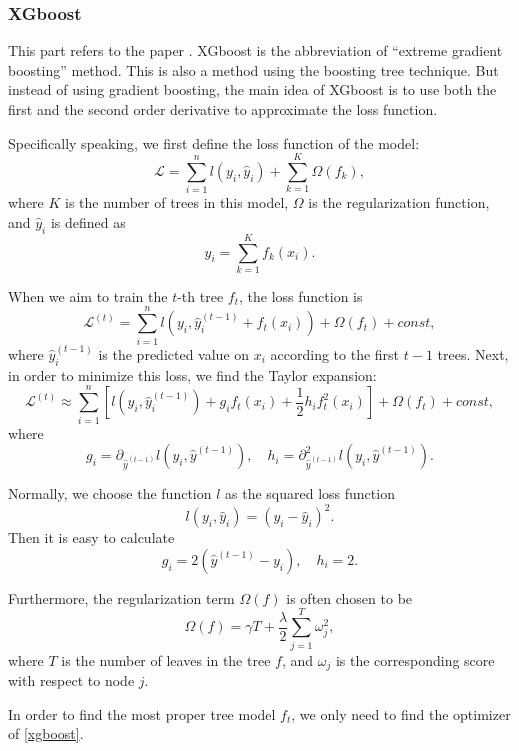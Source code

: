 \documentclass[english]{article}
\begin{document}
\subsubsection{XGboost}
\par This part refers to the paper \cite{chen1603xgboost}. XGboost is the abbreviation of ``extreme gradient boosting'' method. This is also a method using the boosting tree technique. But instead of using gradient boosting, the main idea of XGboost is to use both the first and the second order derivative to approximate the loss function.
\par Specifically speaking, we first define the loss function of the model:
\begin{equation}
	\mathcal{L} = \sum_{i=1}^{n}l(y_{i}, \hat{y}_{i}) + \sum_{k=1}^{K}\Omega(f_{k}),
\end{equation}
where $K$ is the number of trees in this model, $\Omega$ is the regularization function, and $\hat{y}_{i}$ is defined as
\begin{equation}
	\hat{y}_{i} = \sum_{k=1}^{K}f_{k}(x_{i}).
\end{equation}
\par When we aim to train the $t$-th tree $f_{t}$, the loss function is 
\begin{equation}
	\mathcal{L}^{(t)} = \sum_{i=1}^{n}l(y_{i}, \hat{y}_{i}^{(t-1)} + f_{t}(x_{i})) + \Omega(f_{t}) + const,
\end{equation}
where $\hat{y}_{i}^{(t-1)}$ is the predicted value on $x_{i}$ according to the first $t-1$ trees. Next, in order to minimize this loss, we find the Taylor expansion:
\begin{equation}\label{xgboost}
	\mathcal{L}^{(t)}\approx\sum_{i=1}^{n}\left[l(y_{i}, \hat{y}_{i}^{(t-1)}) + g_{i}f_{t}(x_{i}) + \frac{1}{2}h_{i}f_{t}^{2}(x_{i})\right] + \Omega(f_{t}) + const,
\end{equation}
where
\begin{equation}
	g_{i} = \partial_{\hat{y}^{(t-1)}}l(y_{i}, \hat{y}^{(t-1)}), \quad h_{i} = \partial^{2}_{\hat{y}^{(t-1)}}l(y_{i}, \hat{y}^{(t-1)}).
\end{equation}
\par Normally, we choose the function $l$ as the squared loss function
\begin{equation}
	l(y_{i}, \hat{y}_{i}) = (y_{i} - \hat{y}_{i})^{2}.
\end{equation}
Then it is easy to calculate 
\begin{equation}
	g_{i} = 2(\hat{y}^{(t-1)} - y_{i}), \quad h_{i} = 2.
\end{equation}
\par Furthermore, the regularization term $\Omega(f)$ is often chosen to be
\begin{equation}
	\Omega(f) = \gamma T + \frac{\lambda}{2}\sum_{j=1}^{T}\omega_{j}^{2},
\end{equation}
where $T$ is the number of leaves in the tree $f$, and $\omega_{j}$ is the corresponding score with respect to node $j$.
\par In order to find the most proper tree model $f_{t}$, we only need to find the optimizer of \eqref{xgboost}.
\end{document}
